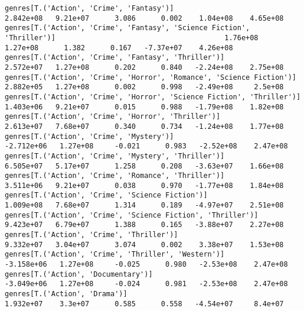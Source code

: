 \documentclass[11pt]{article}
\begin{document}
\begin{Verbatim}[commandchars=\\\{\}]
genres[T.('Action', 'Crime', 'Fantasy')]                                                                      2.842e+08   9.21e+07      3.086      0.002    1.04e+08    4.65e+08
genres[T.('Action', 'Crime', 'Fantasy', 'Science Fiction', 'Thriller')]                                        1.76e+08   1.27e+08      1.382      0.167   -7.37e+07    4.26e+08
genres[T.('Action', 'Crime', 'Fantasy', 'Thriller')]                                                          2.572e+07   1.27e+08      0.202      0.840   -2.24e+08    2.75e+08
genres[T.('Action', 'Crime', 'Horror', 'Romance', 'Science Fiction')]                                         2.882e+05   1.27e+08      0.002      0.998   -2.49e+08     2.5e+08
genres[T.('Action', 'Crime', 'Horror', 'Science Fiction', 'Thriller')]                                        1.403e+06   9.21e+07      0.015      0.988   -1.79e+08    1.82e+08
genres[T.('Action', 'Crime', 'Horror', 'Thriller')]                                                           2.613e+07   7.68e+07      0.340      0.734   -1.24e+08    1.77e+08
genres[T.('Action', 'Crime', 'Mystery')]                                                                     -2.712e+06   1.27e+08     -0.021      0.983   -2.52e+08    2.47e+08
genres[T.('Action', 'Crime', 'Mystery', 'Thriller')]                                                          6.505e+07   5.17e+07      1.258      0.208   -3.63e+07    1.66e+08
genres[T.('Action', 'Crime', 'Romance', 'Thriller')]                                                          3.511e+06   9.21e+07      0.038      0.970   -1.77e+08    1.84e+08
genres[T.('Action', 'Crime', 'Science Fiction')]                                                              1.009e+08   7.68e+07      1.314      0.189   -4.97e+07    2.51e+08
genres[T.('Action', 'Crime', 'Science Fiction', 'Thriller')]                                                  9.423e+07   6.79e+07      1.388      0.165   -3.88e+07    2.27e+08
genres[T.('Action', 'Crime', 'Thriller')]                                                                     9.332e+07   3.04e+07      3.074      0.002    3.38e+07    1.53e+08
genres[T.('Action', 'Crime', 'Thriller', 'Western')]                                                         -3.158e+06   1.27e+08     -0.025      0.980   -2.53e+08    2.47e+08
genres[T.('Action', 'Documentary')]                                                                          -3.049e+06   1.27e+08     -0.024      0.981   -2.53e+08    2.47e+08
genres[T.('Action', 'Drama')]                                                                                 1.932e+07    3.3e+07      0.585      0.558   -4.54e+07     8.4e+07

\end{Verbatim}
\end{document}

